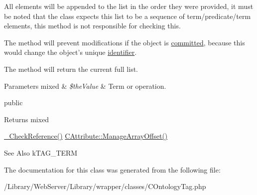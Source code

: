 All elements will be appended to the list in the order they were provided, it must be noted that the class expects this list to be a sequence of term/predicate/term elements, this method is not responsible for checking this.

The method will prevent modifications if the object is \hyperlink{class_c_persistent_object_a6520a7bcecf3f39fd61ec6d08f736e77}{committed}, because this would change the object's unique \hyperlink{}{identifier}.

The method will return the current full list.


\begin{DoxyParams}[1]{Parameters}
mixed & {\em \$the\-Value} & Term or operation.\\
\hline
\end{DoxyParams}
public \begin{DoxyReturn}{Returns}
mixed
\end{DoxyReturn}
\hyperlink{class_c_ontology_term_object_a294971c8d6e1181b0b9ec98ab998d6a0}{\-\_\-\-Check\-Reference()}  \hyperlink{class_c_attribute_ace756c1a8832932ec135104223d1e50c}{C\-Attribute\-::\-Manage\-Array\-Offset()}

\begin{DoxySeeAlso}{See Also}
k\-T\-A\-G\-\_\-\-T\-E\-R\-M 
\end{DoxySeeAlso}


The documentation for this class was generated from the following file\-:\begin{DoxyCompactItemize}
\item 
/\-Library/\-Web\-Server/\-Library/wrapper/classes/C\-Ontology\-Tag.\-php\end{DoxyCompactItemize}
